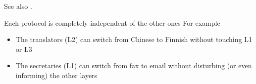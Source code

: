 See also .

\begin{frame}%
  \begin{center}
    \label{fig:translator}%
  \end{center}
\end{frame}

\begin{frame}
  \begin{iblock}{Each protocol is completely independent of the other ones}
    For example
    \begin{itemize}
    \item The translators (L2) can switch from Chinese to Finnish without touching L1 or L3
    \item The secretaries (L1) can switch from fax to email without disturbing (or
      even informing) the other layers
    \end{itemize}
  \end{iblock}
\end{frame}

